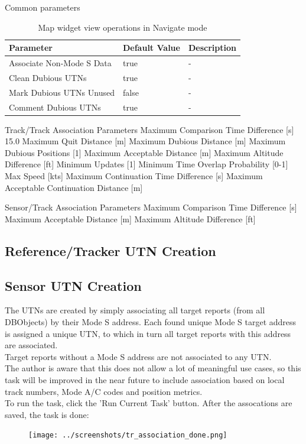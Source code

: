 Common parameters
\begin{table}[H]
  \center
  \begin{tabular}{ | l | l | l |}
    \hline
    \textbf{Parameter} & \textbf{Default Value} &  \textbf{Description} \\ \hline
    Associate Non-Mode S Data & true & - \\ \hline
    Clean Dubious UTNs & true & - \\ \hline
    Mark Dubious UTNs Unused & false & - \\ \hline
    Comment Dubious UTNs & true & - \\ \hline
  \end{tabular}
  \caption{Map widget view operations in Navigate mode}
\end{table}

    Track/Track Association Parameters
    Maximum Comparison Time Difference [s] 15.0
    Maximum Quit Distance [m]
    Maximum Dubious Distance [m]
    Maximum Dubious Positions [1]
    Maximum Acceptable Distance [m]
    Maximum Altitude Difference [ft]
    Minimum Updates [1]
    Minimum Time Overlap Probability [0-1]
    Max Speed [kts]
    Maximum Continuation Time Difference [s]
    Maximum Acceptable Continuation Distance [m]

    Sensor/Track Association Parameters
    Maximum Comparison Time Difference [s]
    Maximum Acceptable Distance [m]
    Maximum Altitude Difference [ft]


\subsection{Reference/Tracker UTN Creation}

\subsection{Sensor UTN Creation}

The UTNs are created by simply associating all target reports (from all DBObjects) by their Mode S address. Each found unique Mode S target address is assigned a unique UTN, to which in turn all target reports with this address are associated. \\

Target reports without a Mode S address are not associated to any UTN. \\

The author is aware that this does not allow a lot of meaningful use cases, so this task will be improved in the near future to include association based on local track numbers, Mode A/C codes and position metrics. \\

To run the task, click the 'Run Current Task' button. After the assocations are saved, the task is done:

\begin{figure}[H]
  \center
    \texttt{[image: ../screenshots/tr\_association\_done.png]}
\end{figure}
